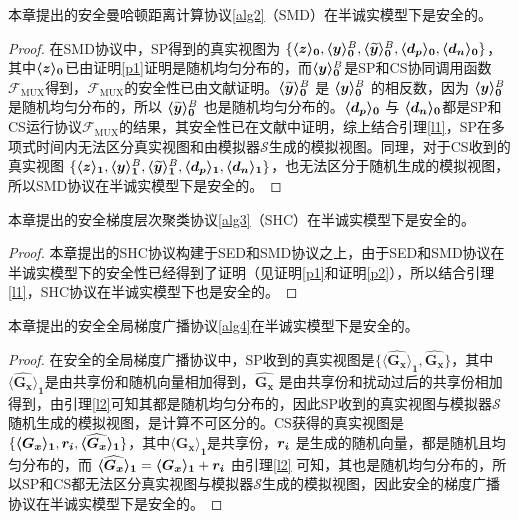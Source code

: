 \begin{theorem}
	本章提出的安全曼哈顿距离计算协议\ref{alg2}（SMD）在半诚实模型下是安全的。
\end{theorem}

\begin{proof}\label{p2}
	在SMD协议中，SP得到的真实视图为 $\{\svec[0]{z}, \svec[0]{y}^B, \svec[0]{\widetilde{y}}^B, \svec[0]{d_p}, \svec[0]{d_n}\}$，其中$\svec[0]{z}$已由证明\ref{p1}证明是随机均匀分布的，而$\svec[0]{y}^B$是SP和CS协同调用函数 $\mathcal{F}_{\text {MUX}}$得到，$\mathcal{F}_{\text {MUX}}$的安全性已由文献\cite{rathee2021sirnn}证明。$\svec[0]{\widetilde{y}}^B$ 是 $\svec[0]{y}^B$ 的相反数，因为 $\svec[0]{y}^B$ 是随机均匀分布的，所以 $\svec[0]{\widetilde{y}}^B$ 也是随机均匀分布的。$\svec[0]{d_p}$ 与 $\svec[0]{d_n}$都是SP和CS运行协议$\mathcal{F}_{\text {MUX}}$的结果，其安全性已在文献\cite{rathee2021sirnn}中证明，综上结合引理\ref{l1}，SP在多项式时间内无法区分真实视图和由模拟器$\mathcal{S}$生成的模拟视图。同理，对于CS收到的真实视图 $\{\svec[1]{z}, \svec[1]{y}^B, \svec[1]{\widetilde{y}}^B, \svec[1]{d_p}, \svec[1]{d_n}\}$，也无法区分于随机生成的模拟视图，所以SMD协议在半诚实模型下是安全的。
\end{proof}

\begin{theorem}
	本章提出的安全梯度层次聚类协议\ref{alg3}（SHC）在半诚实模型下是安全的。
\end{theorem}

\begin{proof}
	本章提出的SHC协议构建于SED和SMD协议之上，由于SED和SMD协议在半诚实模型下的安全性已经得到了证明（见证明\ref{p1}和证明\ref{p2}），所以结合引理\ref{l1}，SHC协议在半诚实模型下也是安全的。
\end{proof}

\begin{theorem}
	本章提出的安全全局梯度广播协议\ref{alg4}在半诚实模型下是安全的。
\end{theorem}

\begin{proof}
	在安全的全局梯度广播协议中，SP收到的真实视图是$\{\boldsymbol{\langle \widehat{G_x}\rangle_1}, \boldsymbol{\widehat{G_x}}\}$，其中$\boldsymbol{\langle \widehat{G_x}\rangle_1}$是由共享份和随机向量相加得到，$\boldsymbol{\widehat{G_x}}$ 是由共享份和扰动过后的共享份相加得到，由引理\ref{l2}可知其都是随机均匀分布的，因此SP收到的真实视图与模拟器$\mathcal{S}$随机生成的模拟视图，是计算不可区分的。CS获得的真实视图是 $\{\boldsymbol{\langle G_x\rangle_1}, \bs{r_i}, \boldsymbol{\langle \widehat{G_x}\rangle_1}\}$，其中$\boldsymbol{\langle G_x\rangle_1}$是共享份，$\bs{r_i}$ 是生成的随机向量，都是随机且均匀分布的，而 $\boldsymbol{\langle \widehat{G_x}\rangle_1} = \boldsymbol{\langle G_x\rangle_1} + \bs{r_i}$ 由引理\ref{l2} 可知，其也是随机均匀分布的，所以SP和CS都无法区分真实视图与模拟器$\mathcal{S}$生成的模拟视图，因此安全的梯度广播协议在半诚实模型下是安全的。
\end{proof}

